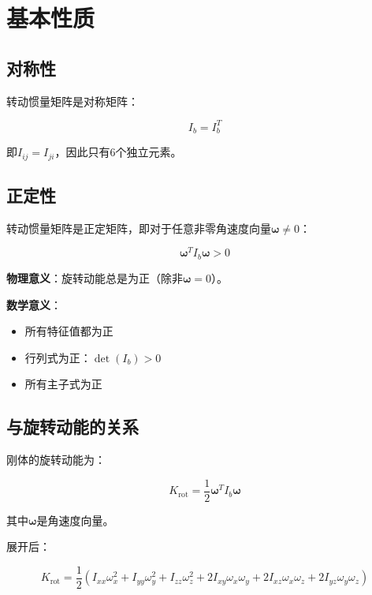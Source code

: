 \documentclass[12pt,a4paper]{article}
\begin{document}
\section{基本性质}

\subsection{对称性}

转动惯量矩阵是对称矩阵：

\begin{equation}
I_b = I_b^T
\end{equation}

即$I_{ij} = I_{ji}$，因此只有6个独立元素。

\subsection{正定性}

转动惯量矩阵是正定矩阵，即对于任意非零角速度向量$\bm{\omega} \neq 0$：

\begin{equation}
\bm{\omega}^T I_b \bm{\omega} > 0
\label{eq:positive_definite}
\end{equation}

\textbf{物理意义}：旋转动能总是为正（除非$\bm{\omega} = 0$）。

\textbf{数学意义}：
\begin{itemize}
\item 所有特征值都为正
\item 行列式为正：$\det(I_b) > 0$
\item 所有主子式为正
\end{itemize}

\subsection{与旋转动能的关系}

刚体的旋转动能为：

\begin{equation}
K_{\text{rot}} = \frac{1}{2} \bm{\omega}^T I_b \bm{\omega}
\label{eq:rotational_kinetic_energy}
\end{equation}

其中$\bm{\omega}$是角速度向量。

展开后：

\begin{equation}
K_{\text{rot}} = \frac{1}{2} (I_{xx} \omega_x^2 + I_{yy} \omega_y^2 + I_{zz} \omega_z^2 + 2I_{xy} \omega_x \omega_y + 2I_{xz} \omega_x \omega_z + 2I_{yz} \omega_y \omega_z)
\end{equation}
\end{document}
